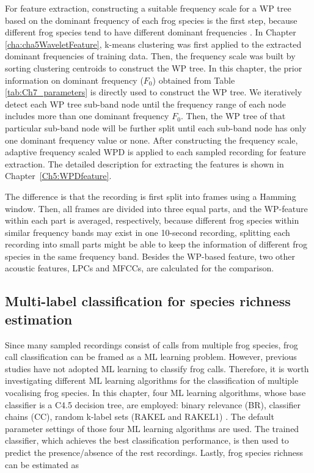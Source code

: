 For feature extraction, constructing a suitable frequency scale for a WP tree based on the dominant frequency of each frog species is the first step, because different frog species tend to have different dominant frequencies \citep{Gingras2013}. In Chapter \ref{cha:cha5WaveletFeature}, k-means clustering was first applied to the extracted dominant frequencies of training data. Then, the frequency scale was built by sorting clustering centroids to construct the WP tree. In this chapter, the prior information on dominant frequency  ($F_{0}$) obtained from Table \ref{tab:Ch7_parameters} is directly used to construct the WP tree. We iteratively detect each WP tree sub-band node until the frequency range of each node includes more than one dominant frequency $F_{0}$. Then, the WP tree of that particular sub-band node will be further split until each sub-band node has only one dominant frequency value or none. After constructing the frequency scale, adaptive frequency scaled WPD is applied to each sampled recording for feature extraction. The detailed description for extracting the features is shown in Chapter~\ref{Ch5:WPDfeature}.



The difference is that the recording is first split into frames using a Hamming window. Then, all frames are divided into three equal parts, and the WP-feature within each part is averaged, respectively, because different frog species within similar frequency bands may exist in one 10-second recording, splitting each recording into small parts might be able to keep the information of different frog species in the same frequency band. Besides the WP-based feature, two other acoustic features, LPCs and MFCCs, are calculated for the comparison.




\subsection{Multi-label classification for species richness estimation} 
Since many sampled recordings consist of calls from multiple frog species, frog call classification can be framed as a ML learning problem. However, previous studies have not adopted ML learning to classify frog calls. Therefore, it is worth investigating different ML learning algorithms for the classification of multiple vocalising frog species. In this chapter, four ML learning algorithms, whose base classifier is a C4.5 decision tree, are employed: binary relevance (BR), classifier chains (CC), random k-label sets (RAKEL and RAKEL1) \citep{ZhangReview2014}. The default parameter settings of those four ML learning algorithms are used. The trained classifier, which achieves the best classification performance, is then used to predict the presence/absence of the rest recordings. Lastly, frog species richness can be estimated as

